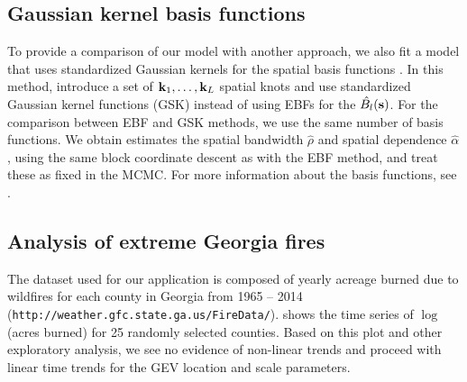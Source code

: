 \documentclass[11pt]{article}
\begin{document}
\subsection{Gaussian kernel basis functions}
To provide a comparison of our model with another approach, we also fit a model that uses standardized Gaussian kernels for the spatial basis functions \citep{Reich2012}.
In this method, \citeauthor{Reich2012} introduce a set of $\mbox{\bf k}_1, \ldots, \mbox{\bf k}_L$ spatial knots and use standardized Gaussian kernel functions (GSK) instead of using EBFs for the $\hat{B_l}(\mbox{\bf s})$.
For the comparison between EBF and GSK methods, we use the same number of basis functions.
We obtain estimates the spatial bandwidth $\hat{\rho}$ and spatial dependence $\hat{\alpha}$, using the same block coordinate descent as with the EBF method, and treat these as fixed in the MCMC.
For more information about the basis functions, see .

\subsection{Analysis of extreme Georgia fires}\label{ebs:georgia}
The dataset used for our application is composed of yearly acreage burned due to wildfires for each county in Georgia from 1965 -- 2014 (\texttt{http://weather.gfc.state.ga.us/FireData/}).
 shows the time series of $\log$(acres burned) for 25 randomly selected counties.
Based on this plot and other exploratory analysis, we see no evidence of non-linear trends and proceed with linear time trends for the GEV location and scale parameters.
\end{document}
